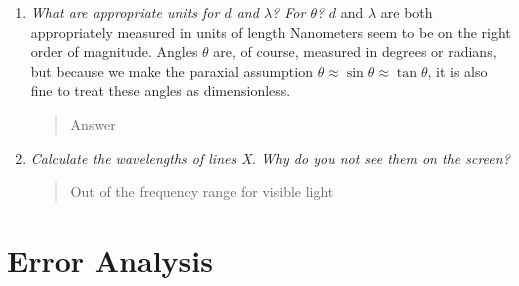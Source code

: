 \documentclass{amsart}
\begin{document}
\begin{enumerate}
\item {\textit{What are appropriate units for $d$ and $\lambda$? For $\theta$?}
$d$ and $\lambda$ are both appropriately measured in units of length Nanometers seem to be on the right order of magnitude. Angles $\theta$ are, of course, measured in degrees or radians, but because we make the paraxial assumption $\theta\approx\sin\theta\approx\tan\theta$, it is also fine to treat these angles as dimensionless. 
\begin{quote}
Answer
\end{quote}}

\item{\textit{Calculate the wavelengths of lines X. Why do you not see them on the screen?}
\begin{quote}
Out of the frequency range for visible light
\end{quote}}

\end{enumerate}

\section{Error Analysis}
\end{document}
